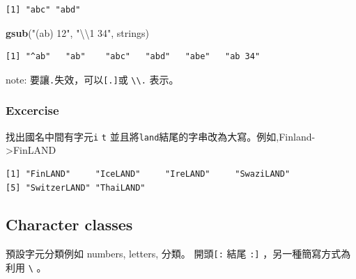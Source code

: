 \documentclass[]{book}
\newenvironment{Shaded}{\begin{snugshade}}{\end{snugshade}}
\newcommand{\CharTok}[1]{\textcolor[rgb]{0.31,0.60,0.02}{#1}}
\newcommand{\KeywordTok}[1]{\textcolor[rgb]{0.13,0.29,0.53}{\textbf{#1}}}
\newcommand{\NormalTok}[1]{#1}
\newcommand{\StringTok}[1]{\textcolor[rgb]{0.31,0.60,0.02}{#1}}
\theoremstyle{definition}
\theoremstyle{definition}
\theoremstyle{definition}
\theoremstyle{remark}
\begin{document}
\begin{verbatim}
[1] "abc" "abd"
\end{verbatim}

\begin{Shaded}
\begin{Highlighting}[]
\KeywordTok{gsub}\NormalTok{(}\StringTok{"(ab) 12"}\NormalTok{, }\StringTok{"}\CharTok{\textbackslash{}\textbackslash{}}\StringTok{1 34"}\NormalTok{, strings) }
\end{Highlighting}
\end{Shaded}

\begin{verbatim}
[1] "^ab"   "ab"    "abc"   "abd"   "abe"   "ab 34"
\end{verbatim}

note: 要讓\texttt{.}失效，可以\texttt{{[}.{]}}或
\texttt{\textbackslash{}\textbackslash{}.} 表示。

\hypertarget{excercise}{%
\subsubsection{Excercise}\label{excercise}}

找出國名中間有字元\texttt{i} \texttt{t}
並且將\texttt{land}結尾的字串改為大寫。例如,Finland-\textgreater{}FinLAND

\begin{verbatim}
[1] "FinLAND"     "IceLAND"     "IreLAND"     "SwaziLAND"  
[5] "SwitzerLAND" "ThaiLAND"   
\end{verbatim}

\hypertarget{character-classes}{%
\subsection{Character classes}\label{character-classes}}

預設字元分類例如 numbers, letters, 分類。 開頭\texttt{{[}:} 結尾
\texttt{:{]}} ，另一種簡寫方式為利用 \texttt{\textbackslash{}} 。
\end{document}
